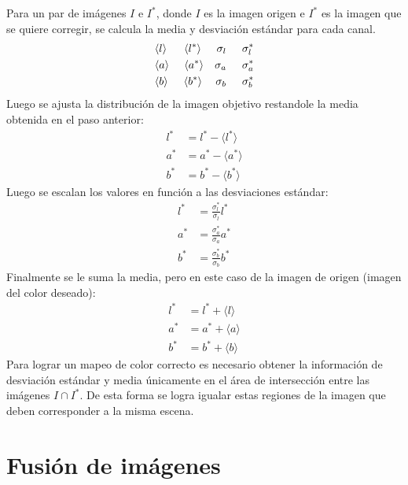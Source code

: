 Para un par de imágenes $I$ e $I^*$, donde $I$ es la imagen origen e $I^*$ es la imagen que se quiere corregir, se calcula la media y desviación estándar para cada canal.
\begin{align*}
&{\langle l \rangle} \hspace{0.55cm} {\langle l^* \rangle}  &{ \sigma_l } \hspace{0.5cm} { \sigma^*_l } \\
&{\langle a \rangle} \hspace{0.48cm} {\langle a^* \rangle}  &{ \sigma_a } \hspace{0.5cm} { \sigma^*_a }  \\
&{\langle b \rangle} \hspace{0.5cm} {\langle b^* \rangle}  &{ \sigma_b } \hspace{0.5cm} { \sigma^*_b } 
\end{align*}
Luego se ajusta la distribución de la imagen objetivo restandole la media obtenida en el paso anterior:
\begin{align*}
l^* &= l^* - \langle l^* \rangle \\
a^* &= a^* - \langle a^* \rangle \\
b^* &= b^* - \langle b^* \rangle
\end{align*}
Luego se escalan los valores en función a las desviaciones estándar:
\begin{align*}
l^* &= \frac{\sigma^*_l}{\sigma_l} l^* \\
a^* &= \frac{\sigma^*_a}{\sigma_a} a^* \\
b^* &= \frac{\sigma^*_b}{\sigma_b} b^*
\end{align*}
Finalmente se le suma la media, pero en este caso de la imagen de origen (imagen del color deseado):
\begin{align*}
l^* &= l^* + \langle l \rangle \\
a^* &= a^* + \langle a \rangle \\
b^* &= b^* + \langle b \rangle
\end{align*}
Para lograr un mapeo de color correcto es necesario obtener la información de desviación estándar y media únicamente en el área de intersección entre las imágenes $I\cap I^*$. De esta forma se logra igualar estas regiones de la imagen que deben corresponder a la misma escena.


\section{Fusión de imágenes}

